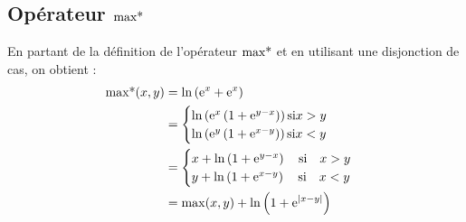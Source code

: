 \subsection{Opérateur $\operatorname*{max*}$}\label{append:maxstar}
En partant de la définition de l’opérateur $\operatorname*{max*}$ et en utilisant une disjonction de cas, on obtient : 
\begin{align*}
	\operatorname*{max*}(x,y) & = \ln\left(\mathrm{e}^x+\mathrm{e}^x\right)              \\
	              & =\begin{cases}                           
	\ln	\left(\mathrm{e}^x\left(1+\mathrm{e}^{y-x}\right)\right) \text{si} x>y  \\
	\ln	\left(\mathrm{e}^y\left(1+\mathrm{e}^{x-y}\right)\right) \text{si} x<y
	\end{cases}\\
	              & =\begin{cases}                           
	x + \ln\left(1+\mathrm{e}^{y-x}\right) \quad\text{si}\quad x>y  \\
	y+\ln\left(1+\mathrm{e}^{x-y}\right) \quad\text{si}\quad x<y
	\end{cases}\\
	              & =\max(x,y) +\ln\left(1+\mathrm{e}^{|x-y|}\right) 
\end{align*}








